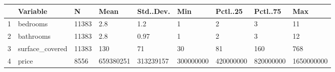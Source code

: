 \begin{tabular}{rllllllll}
  \hline
 & Variable & N & Mean & Std..Dev. & Min & Pctl..25 & Pctl..75 & Max \\ 
  \hline
1 & bedrooms & 11383 & 2.8 & 1.2 & 1 & 2 & 3 & 11 \\ 
  2 & bathrooms & 11383 & 2.8 & 0.97 & 1 & 2 & 3 & 12 \\ 
  3 & surface\_covered & 11383 & 130 & 71 & 30 & 81 & 160 & 768 \\ 
  4 & price & 8556 & 659380251 & 313239157 & 300000000 & 420000000 & 820000000 & 1650000000 \\ 
   \hline
\end{tabular}
